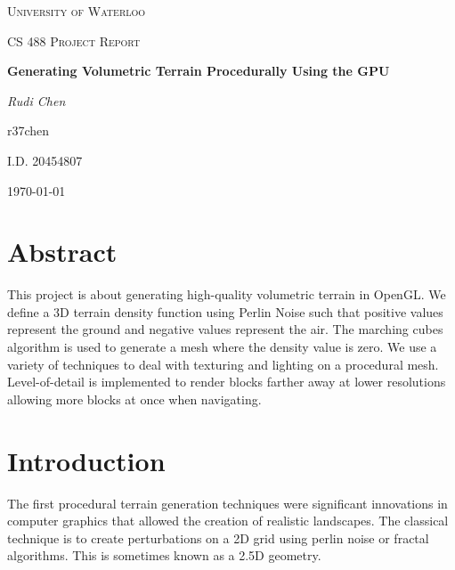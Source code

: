 \documentclass {article}
\begin{document}
\begin{titlepage}
    \centering
    {\scshape\LARGE \phantom{.} \par}
    \vspace{2cm}
    {\scshape\LARGE University of Waterloo \par}
    \vspace{2cm}
    {\scshape\Large CS 488 Project Report\par}
    \vspace{2.5cm}
    {\huge\bfseries Generating Volumetric Terrain Procedurally Using the GPU\par}
    \vspace{2.5cm}
    {\LARGE\itshape Rudi Chen\par}
    {\Large r37chen\par}
    {\Large I.D. 20454807\par}

    \vfill

    {\large \today\par}
\end{titlepage}

\section{Abstract}

This project is about generating high-quality volumetric terrain in OpenGL. We define a 3D terrain density function using Perlin Noise such that positive values represent the ground and negative values represent the air. The marching cubes algorithm is used to generate a mesh where the density value is zero. We use a variety of techniques to deal with texturing and lighting on a procedural mesh. Level-of-detail is implemented to render blocks farther away at lower resolutions allowing more blocks at once when navigating.

\section{Introduction}

The first procedural terrain generation techniques were significant innovations in computer graphics that allowed the creation of realistic landscapes. The classical technique is to create perturbations on a 2D grid using perlin noise or fractal algorithms. This is sometimes known as a 2.5D geometry.
\end{document}
